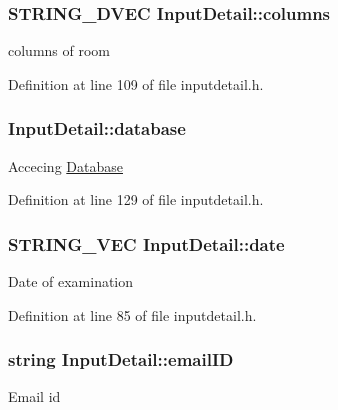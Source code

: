 \hypertarget{classInputDetail_a8563f1b6c4d2e74a9b8421a12585395c}{
\subsubsection[{columns}]{\setlength{\rightskip}{0pt plus 5cm}S\-T\-R\-I\-N\-G\-\_\-D\-V\-E\-C Input\-Detail\-::columns\hspace{0.3cm}{\ttfamily [protected]}}}\label{classInputDetail_a8563f1b6c4d2e74a9b8421a12585395c}
columns of room 

Definition at line 109 of file inputdetail.\-h.

\hypertarget{classInputDetail_a479cd6c13833bd5de6e5630078c961b6}{
\subsubsection[{database}]{ Input\-Detail\-::database}}\label{classInputDetail_a479cd6c13833bd5de6e5630078c961b6}
Accecing \hyperlink{classDatabase}{Database} 

Definition at line 129 of file inputdetail.\-h.

\hypertarget{classInputDetail_a7d1c7ceb33eb86058e00c3a6a68cae4a}{
\subsubsection[{date}]{\setlength{\rightskip}{0pt plus 5cm}S\-T\-R\-I\-N\-G\-\_\-\-V\-E\-C Input\-Detail\-::date\hspace{0.3cm}{\ttfamily [protected]}}}\label{classInputDetail_a7d1c7ceb33eb86058e00c3a6a68cae4a}
Date of examination 

Definition at line 85 of file inputdetail.\-h.

\hypertarget{classInputDetail_ad3f1db4fddbe0d4efbf1d5bc74d52257}{
\subsubsection[{email\-I\-D}]{\setlength{\rightskip}{0pt plus 5cm}string Input\-Detail\-::email\-I\-D\hspace{0.3cm}{\ttfamily [protected]}}}\label{classInputDetail_ad3f1db4fddbe0d4efbf1d5bc74d52257}
Email id 

